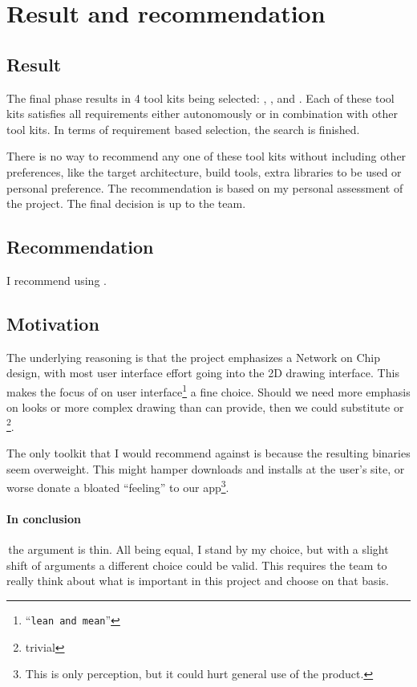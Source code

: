 \section{Result and recommendation}

\subsection{Result}

The final phase results in 4 tool kits being selected: , ,
 and . Each of these tool kits satisfies all requirements
either autonomously or in combination with other tool kits. In terms of
requirement based selection, the search is finished. 

There is no way to recommend any one of these tool kits without including other
preferences, like the target architecture, build tools, extra libraries to be
used or personal preference. The recommendation is based on my personal
assessment of the project. The final decision is up to the team.

\subsection{Recommendation} 

I recommend using .

\subsection{Motivation}

The underlying reasoning is that the project emphasizes a Network on Chip
design, with most user interface effort going into the 2D drawing interface.
This makes the focus of  on user interface\footnote{``\texttt{lean and
mean}''} a fine choice. Should we need more emphasis on looks or more complex
drawing than  can provide, then we could substitute  or
\footnote{%
trivial}.

The only toolkit that I would recommend against is  because the
resulting binaries seem overweight. This might hamper downloads and installs at
the user's site, or worse donate a bloated ``feeling'' to our app\footnote{This
is only perception, but it could hurt general use of the product.}. 

\paragraph{In conclusion}\,the argument is thin. All being equal, I stand by my
choice, but with a slight shift of arguments a different choice could be valid.
This requires the team to really think about what is important in this project
and choose on that basis.


